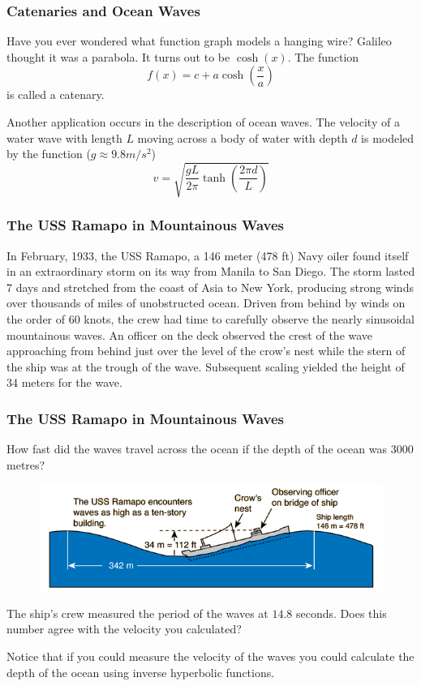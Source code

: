\documentclass[xcolor=dvipsnames]{beamer}
\begin{document}
\begin{frame}
  \frametitle{Catenaries and Ocean Waves}
   Have you ever wondered what function graph
  models a hanging wire? Galileo thought it was a parabola. It turns
  out to be $\cosh(x)$. The function
  \begin{equation}
    \label{eq:keechieg}
    f(x)=c+a\cosh\left(\frac{x}{a}\right)
  \end{equation}
  is called a \alert{catenary}.

  \bigskip

   Another application occurs in the description
  of ocean waves. The velocity of a water wave with length $L$ moving
  across a body of water with depth $d$ is modeled by the function
  ($g\approx{}9.8m/s^{2}$)
  \begin{equation}
    \label{eq:oghaivae}
    v=\sqrt{\frac{gL}{2\pi}\tanh\left(\frac{2\pi{}d}{L}\right)}
  \end{equation}
\end{frame}

\begin{frame}
  \frametitle{The USS Ramapo in Mountainous Waves}
   In February, 1933, the USS Ramapo, a 146 meter
  (478 ft) Navy oiler found itself in an extraordinary storm on its
  way from Manila to San Diego. The storm lasted 7 days and stretched
  from the coast of Asia to New York, producing strong winds over
  thousands of miles of unobstructed ocean. Driven from behind by
  winds on the order of 60 knots, the crew had time to carefully
  observe the nearly sinusoidal mountainous waves. An officer on the
  deck observed the crest of the wave approaching from behind just
  over the level of the crow's nest while the stern of the ship was at
  the trough of the wave. Subsequent scaling yielded the height of 34
  meters for the wave.
\end{frame}

\begin{frame}
  \frametitle{The USS Ramapo in Mountainous Waves}
  {\ubung} How fast did the waves travel across the ocean if the depth
  of the ocean was 3000 metres?
\begin{figure}[h]
\includegraphics[scale=.5]{./diagrams/ramapo.png}
\end{figure}
The ship's crew measured the period of the waves at $14.8$ seconds.
Does this number agree with the velocity you calculated?

Notice that if you could measure the velocity of the waves you could
calculate the depth of the ocean using \alert{inverse hyperbolic
  functions}. 
\end{frame}
\end{document}

